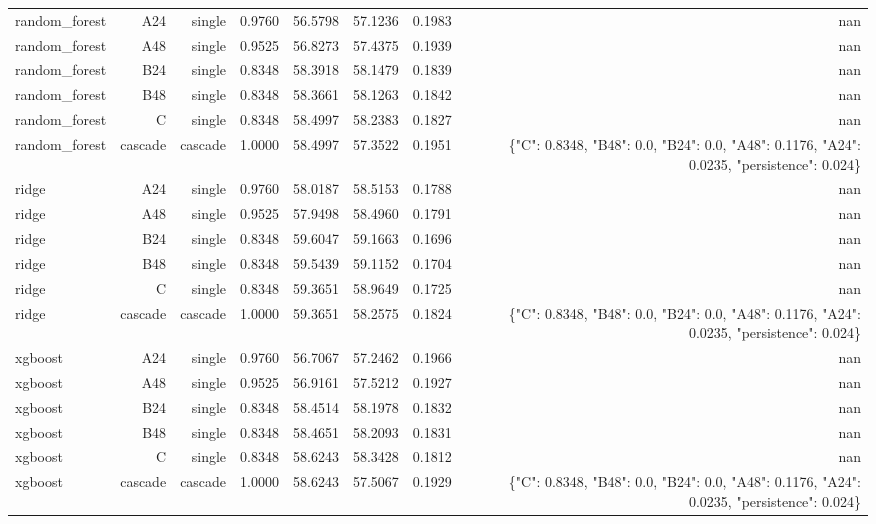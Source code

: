 \begin{table}[htbp]
\begin{tabular}{lrrrrrrr}
random\_forest & A24 & single & 0.9760 & 56.5798 & 57.1236 & 0.1983 & nan \\
random\_forest & A48 & single & 0.9525 & 56.8273 & 57.4375 & 0.1939 & nan \\
random\_forest & B24 & single & 0.8348 & 58.3918 & 58.1479 & 0.1839 & nan \\
random\_forest & B48 & single & 0.8348 & 58.3661 & 58.1263 & 0.1842 & nan \\
random\_forest & C & single & 0.8348 & 58.4997 & 58.2383 & 0.1827 & nan \\
random\_forest & cascade & cascade & 1.0000 & 58.4997 & 57.3522 & 0.1951 & \{"C": 0.8348, "B48": 0.0, "B24": 0.0, "A48": 0.1176, "A24": 0.0235, "persistence": 0.024\} \\
ridge & A24 & single & 0.9760 & 58.0187 & 58.5153 & 0.1788 & nan \\
ridge & A48 & single & 0.9525 & 57.9498 & 58.4960 & 0.1791 & nan \\
ridge & B24 & single & 0.8348 & 59.6047 & 59.1663 & 0.1696 & nan \\
ridge & B48 & single & 0.8348 & 59.5439 & 59.1152 & 0.1704 & nan \\
ridge & C & single & 0.8348 & 59.3651 & 58.9649 & 0.1725 & nan \\
ridge & cascade & cascade & 1.0000 & 59.3651 & 58.2575 & 0.1824 & \{"C": 0.8348, "B48": 0.0, "B24": 0.0, "A48": 0.1176, "A24": 0.0235, "persistence": 0.024\} \\
xgboost & A24 & single & 0.9760 & 56.7067 & 57.2462 & 0.1966 & nan \\
xgboost & A48 & single & 0.9525 & 56.9161 & 57.5212 & 0.1927 & nan \\
xgboost & B24 & single & 0.8348 & 58.4514 & 58.1978 & 0.1832 & nan \\
xgboost & B48 & single & 0.8348 & 58.4651 & 58.2093 & 0.1831 & nan \\
xgboost & C & single & 0.8348 & 58.6243 & 58.3428 & 0.1812 & nan \\
xgboost & cascade & cascade & 1.0000 & 58.6243 & 57.5067 & 0.1929 & \{"C": 0.8348, "B48": 0.0, "B24": 0.0, "A48": 0.1176, "A24": 0.0235, "persistence": 0.024\} \\
\bottomrule
\end{tabular}
\end{table}

